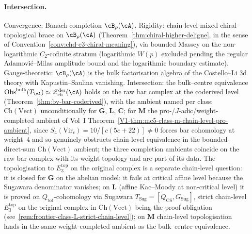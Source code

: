 \paragraph{Intersection.}
Convergence: Banach completion $\cB_\rho(\cA)$. Rigidity:
chain-level mixed chiral-topological brace on $\cB_\rho(\cA)$
(Theorem~\ref{thm:chiral-higher-deligne}, in the sense of
Convention~\ref{conv:chd-e3-chiral-meaning}), via bounded Massey on the
non-logarithmic $C_2$-cofinite stratum (logarithmic $W(p)$ excluded
pending the regular Adamovi\'c--Milas amplitude bound and the
logarithmic boundary estimate).
Gauge-theoretic: $\cB_\rho(\cA)$ is the bulk factorisation
algebra of the Costello--Li 3d theory with Kapustin--Saulina
vanishing. Intersection: the bulk--centre equivalence
$\mathrm{Obs}^{\mathrm{bulk}}(T_\cA) \simeq
\cZ^{\mathrm{der}}_{\mathrm{ch}}(\cA)$ holds on the raw bar
complex at the coderived level
(Theorem~\ref{thm:bv-bar-coderived}), with the ambient named
per class: $\mathrm{Ch}(\mathrm{Vect})$ unconditionally for
$\mathbf{G}$, $\mathbf{L}$, $\mathbf{C}$; for $\mathbf{M}$ the
pro-/$J$-adic/weight-completed ambient of Vol~I
Theorem~\ref{V1-thm:mc5-class-m-chain-level-pro-ambient}, since
$S_4(\mathrm{Vir}_c) = 10/[c(5c+22)] \ne 0$ forces bar
cohomology at weight~$4$ and so genuinely obstructs chain-level
equivalence in the bounded-direct-sum $\mathrm{Ch}(\mathrm{Vect})$
ambient; the three completion ambients coincide on the raw bar
complex with its weight topology and are part of its data. The
topologisation to $E_3^{\mathrm{top}}$ on the original complex
is a separate chain-level question: it is closed for
$\mathbf{G}$ on the abelian model; it fails at critical affine
level because the Sugawara denominator vanishes; on $\mathbf{L}$
(affine Kac--Moody at non-critical level) it is proved on
$Q_{\mathrm{tot}}$-cohomology via Sugawara
$T_{\mathrm{Sug}} = [Q_{\mathrm{CS}}, G_{\mathrm{Sug}}]$, strict
chain-level $E_3^{\mathrm{top}}$ on the original complex in
$\mathrm{Ch}(\mathrm{Vect})$ being the proof obligation
(see~\ref{rem:frontier-class-L-strict-chain-level}); on
$\mathbf{M}$ chain-level topologisation lands in the same
weight-completed ambient as the bulk--centre equivalence.

